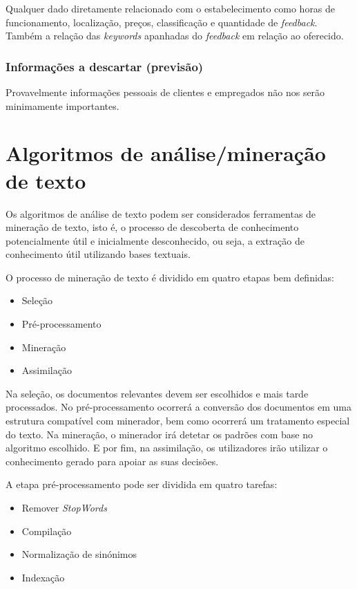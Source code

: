 \documentclass[a4paper,10pt]{article}
\begin{document}
Qualquer dado diretamente relacionado com o estabelecimento como horas de funcionamento, localização, preços, classificação e quantidade de \textit{feedback}.
Também a relação das \textit{keywords} apanhadas do \textit{feedback} em relação ao oferecido.

\subsubsection{Informações a descartar (previsão)}

Provavelmente informações pessoais de clientes e empregados não nos serão minimamente importantes.

\section{Algoritmos de análise/mineração de texto}

Os algoritmos de análise de texto podem ser considerados ferramentas de mineração de texto, isto é, o processo de descoberta de conhecimento potencialmente útil e inicialmente desconhecido, ou seja, a extração de conhecimento útil utilizando bases textuais.

O processo de mineração de texto é dividido em quatro etapas bem definidas:
\begin{itemize}
    \item Seleção
    \item Pré-processamento
    \item Mineração
    \item Assimilação
\end{itemize}

Na seleção, os documentos relevantes devem ser escolhidos e mais tarde processados.
No pré-processamento ocorrerá a conversão dos documentos em uma estrutura compatível com minerador, bem como ocorrerá um tratamento especial do texto.
Na mineração, o minerador irá detetar os padrões com base no algoritmo escolhido.
E por fim, na assimilação, os utilizadores irão utilizar o conhecimento gerado para apoiar as suas decisões.

A etapa pré-processamento pode ser dividida em quatro tarefas:
\begin{itemize}
    \item Remover \textit{StopWords}
    \item Compilação
    \item Normalização de sinónimos
    \item Indexação
\end{itemize}
\end{document}

